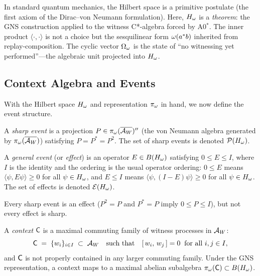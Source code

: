 \begin{remark}
\label{rem:hilbert-derived}
In standard quantum mechanics, the Hilbert space is a primitive postulate
(the first axiom of the Dirac--von Neumann formulation).  Here, $H_\omega$
is a \emph{theorem}: the GNS construction applied to the witness C*-algebra
forced by A0$^*$.  The inner product $\langle \cdot, \cdot \rangle$ is not
a choice but the sesquilinear form $\omega(a^* b)$ inherited from
replay-composition.  The cyclic vector $\Omega_\omega$ is the state of ``no
witnessing yet performed''---the algebraic unit projected into $H_\omega$.
\end{remark}

\subsection{Context Algebra and Events}
\label{sec:context-born:contexts}

With the Hilbert space $H_\omega$ and representation $\pi_\omega$ in hand, we
now define the event structure.

\begin{definition}
\label{def:sharp-events}
A \emph{sharp event} is a projection $P \in \pi_\omega(\overline{\mathcal{A}_W})''$
(the von Neumann algebra generated by $\pi_\omega(\overline{\mathcal{A}_W})$) satisfying
$P = P^* = P^2$.  The set of sharp events is denoted
$\mathcal{P}(H_\omega)$.
\end{definition}

\begin{definition}
\label{def:effects}
A \emph{general event} (or \emph{effect}) is an operator
$E \in B(H_\omega)$ satisfying $0 \leq E \leq I$, where $I$ is the
identity and the ordering is the usual operator ordering:
$0 \leq E$ means $\langle \psi, E\psi \rangle \geq 0$ for all
$\psi \in H_\omega$, and $E \leq I$ means
$\langle \psi, (I - E)\psi \rangle \geq 0$ for all $\psi \in H_\omega$.
The set of effects is denoted $\mathcal{E}(H_\omega)$.

Every sharp event is an effect ($P^2 = P$ and $P^* = P$ imply
$0 \leq P \leq I$), but not every effect is sharp.
\end{definition}

\begin{definition}[Context]
\label{def:context}
A \emph{context} $\mathsf{C}$ is a maximal commuting family of witness
processes in $\mathcal{A}_W$:
\[
  \mathsf{C} \;=\; \{w_i\}_{i \in I} \;\subset\; \mathcal{A}_W
  \quad\text{such that}\quad
  [\,w_i,\,w_j\,] = 0 \;\;\text{for all } i, j \in I,
\]
and $\mathsf{C}$ is not properly contained in any larger commuting family.
Under the GNS representation, a context maps to a maximal abelian
subalgebra $\pi_\omega(\mathsf{C}) \subset B(H_\omega)$.
\end{definition}

